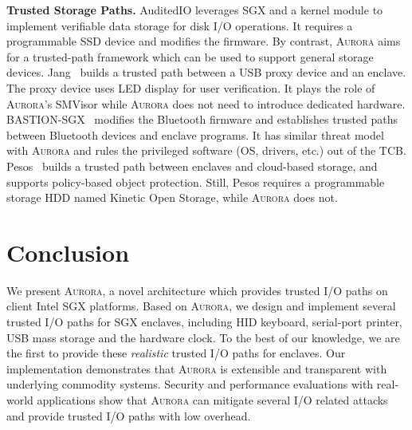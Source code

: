 \documentclass[journal,twocolumn,letterpaper,10pt]{IEEEtran}
\begin{document}
\textbf{Trusted Storage Paths.}
AuditedIO \cite{DBLP:conf/apsys/BalakrishnanCBS17} leverages SGX and a kernel module to implement verifiable data storage for disk I/O operations. It requires a programmable SSD device and modifies the firmware.
By contrast, \textsc{Aurora} aims for a trusted-path framework which can be used to support general storage devices. %
Jang~\cite{Jang2017Building} builds a trusted path between a USB proxy device and an enclave. The proxy device uses LED display for user verification. It plays the role of  \textsc{Aurora}'s SMVisor while \textsc{Aurora} does not need to introduce dedicated hardware. %
BASTION-SGX~\cite{DBLP:conf/isca/PetersLVPK18} modifies the Bluetooth firmware and establishes trusted paths between Bluetooth  devices and enclave programs. It has similar threat model with \textsc{Aurora} and rules the privileged software (OS, drivers, etc.) out of the TCB. %
Pesos~\cite{DBLP:conf/eurosys/KrahnTVKBF18} builds a trusted path between enclaves and cloud-based storage, and supports policy-based object protection. Still, Pesos requires a programmable storage HDD named Kinetic Open Storage, while \textsc{Aurora} does not.

\section{Conclusion}

We present \textsc{Aurora}, a novel architecture which provides trusted I/O paths on client Intel SGX platforms. Based on \textsc{Aurora}, we design and implement several trusted I/O paths for SGX enclaves, including HID keyboard, serial-port printer, USB mass storage and the hardware clock. To the best of our knowledge, we are the first to provide these \emph{realistic} trusted I/O paths for enclaves. Our implementation demonstrates that \textsc{Aurora} is extensible and transparent with underlying commodity systems. Security and performance evaluations with real-world applications show that \textsc{Aurora} can mitigate several I/O related attacks and provide trusted I/O paths with low overhead.
\end{document}
